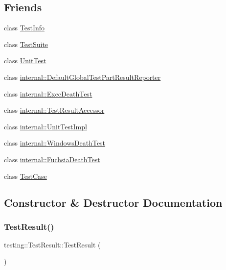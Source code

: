 \subsection*{Friends}
\begin{DoxyCompactItemize}
\item 
class \mbox{\hyperlink{classtesting_1_1_test_result_aed3c96e2bd5a46339c1cbe49a4a233ee}{Test\+Info}}
\item 
class \mbox{\hyperlink{classtesting_1_1_test_result_afa75eb3bdc22807c1d4fcf818c6f0fbf}{Test\+Suite}}
\item 
class \mbox{\hyperlink{classtesting_1_1_test_result_aaeb07ea6ba11473f5b2ff2067a1d734a}{Unit\+Test}}
\item 
class \mbox{\hyperlink{classtesting_1_1_test_result_ac731f0389a3fc3cae64a80a5e53acc2a}{internal\+::\+Default\+Global\+Test\+Part\+Result\+Reporter}}
\item 
class \mbox{\hyperlink{classtesting_1_1_test_result_a6a009268369159ee3ff3d162e5c9f0b4}{internal\+::\+Exec\+Death\+Test}}
\item 
class \mbox{\hyperlink{classtesting_1_1_test_result_a9409280e3d708ddb050e1b9922b91522}{internal\+::\+Test\+Result\+Accessor}}
\item 
class \mbox{\hyperlink{classtesting_1_1_test_result_aa684cc13a8f91b00c0c9ce41ec7474eb}{internal\+::\+Unit\+Test\+Impl}}
\item 
class \mbox{\hyperlink{classtesting_1_1_test_result_ab7ea7e66d98b6380f6216e44ce744390}{internal\+::\+Windows\+Death\+Test}}
\item 
class \mbox{\hyperlink{classtesting_1_1_test_result_af3cc379e9a2ab2709256b2b50aeaa974}{internal\+::\+Fuchsia\+Death\+Test}}
\item 
class \mbox{\hyperlink{classtesting_1_1_test_result_aff779e55b06adfa7c0088bd10253f0f0}{Test\+Case}}
\end{DoxyCompactItemize}


\subsection{Constructor \& Destructor Documentation}
\mbox{\label{classtesting_1_1_test_result_a5cf5dd6f416b7334ea601aab21a2fda5}} 
\subsubsection{\texorpdfstring{TestResult()}{TestResult()}\hspace{0.1cm}{\footnotesize\ttfamily [1/3]}}
{\footnotesize\ttfamily testing\+::\+Test\+Result\+::\+Test\+Result (\begin{DoxyParamCaption}{ }\end{DoxyParamCaption})}

